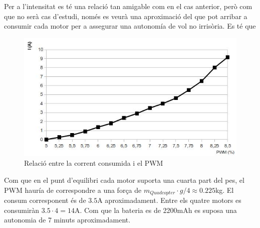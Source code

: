 \documentclass[twoside]{article}
\begin{document}
Per a l'intensitat es té una relació tan amigable com en el cas anterior, però com que no serà cas d'estudi, només es veurà una aproximació del que pot arribar a consumir cada motor per a assegurar una autonomía de vol no irrisòria. Es té que 
\newpage
\begin{figure}[!h]
\begin{center}
\includegraphics[scale=0.8]{images/IvsPWM.jpeg}
\caption{Relació entre la corrent consumida i el PWM}
\end{center}
\end{figure}

Com que en el punt d'equilibri cada motor suporta una cuarta part del pes, el PWM hauría de correspondre a una força de $m_{Quadcopter}\cdot g/4\approx0.225$kg. El consum corresponent és de $3.5$A aproximadament. Entre els quatre motors es consumiràn $3.5 \cdot 4=14$A. Com que la bateria es de 2200mAh es suposa una autonomia de 7 minuts aproximadament. 
\end{document}
